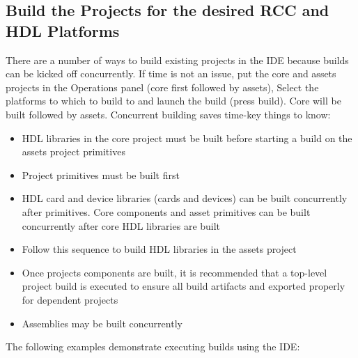\documentclass[10pt, a4paper, oneside]{article}
\begin{document}
\subsection{Build the Projects for the desired RCC and HDL Platforms}
There are a number of ways to build existing projects in the IDE because builds can be kicked off concurrently. If time is not an issue, put the core and assets projects in the Operations panel (core first followed by assets), Select the platforms to which to build to and launch the build (press build). Core will be built followed by assets.
Concurrent building saves time-key things to know:
\begin{itemize}
\item	HDL libraries in the core project must be built before starting a build on the assets project primitives
\item	Project primitives must be built first
\item	HDL card and device libraries (cards and devices) can be built concurrently after primitives. Core components and asset primitives can be built concurrently after core HDL libraries are built
\item	Follow this sequence to build HDL libraries in the assets project
\item	Once projects components are built, it is recommended that a top-level project build is executed to ensure all build artifacts and exported properly for dependent projects
\item	Assemblies may be built concurrently
\end{itemize}
The following examples demonstrate executing builds using the IDE:
\end{document}
